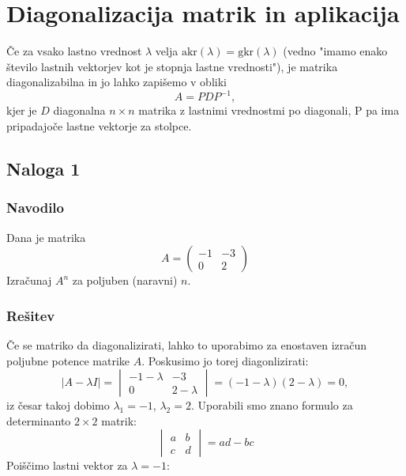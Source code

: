 \documentclass{article}
\begin{document}
\section*{Diagonalizacija matrik in aplikacija}
Če za vsako lastno vrednost $\lambda$ velja $\mathrm{akr}(\lambda) = \mathrm{gkr}(\lambda)$ (vedno "{}imamo enako število lastnih vektorjev kot je stopnja lastne vrednosti"{}), je matrika diagonalizabilna in jo lahko zapišemo v obliki
\begin{equation*}
A = P D P^{-1},
\end{equation*}
kjer je $D$ diagonalna $n \times n$ matrika z lastnimi vrednostmi po diagonali, P pa ima pripadajoče lastne vektorje za stolpce.

\subsection*{Naloga 1}
\subsubsection*{Navodilo}
Dana je matrika 
\begin{equation*}
A = \begin{pmatrix}
-1 & -3 \\
0  & 2
\end{pmatrix}
\end{equation*}
Izračunaj $A^n$ za poljuben (naravni) $n$.
\subsubsection*{Rešitev}
Če se matriko da diagonalizirati, lahko to uporabimo za enostaven izračun poljubne potence matrike $A$. Poskusimo jo torej diagonlizirati:
\begin{equation*}
|A-\lambda I | =
\begin{vmatrix}
-1-\lambda & -3 \\
0  & 2-\lambda
\end{vmatrix} = (-1-\lambda)(2-\lambda) = 0,
\end{equation*}
iz česar takoj dobimo $\lambda_1 = -1$, $\lambda_2 = 2$. Uporabili smo znano formulo za determinanto $2 \times 2$ matrik:
\begin{equation*}
\begin{vmatrix}
a &b \\
c & d
\end{vmatrix} = ad - bc
\end{equation*}
Poiščimo lastni vektor za $\lambda = -1$:
\end{document}
